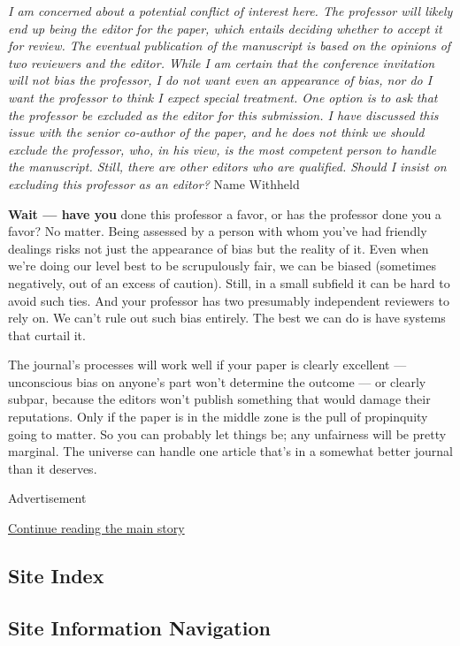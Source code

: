 \emph{I am concerned about a potential conflict of interest here. The
professor will likely end up being the editor for the paper, which
entails deciding whether to accept it for review. The eventual
publication of the manuscript is based on the opinions of two reviewers
and the editor. While I am certain that the conference invitation will
not bias the professor, I do not want even an appearance of bias, nor do
I want the professor to think I expect special treatment. One option is
to ask that the professor be excluded as the editor for this submission.
I have discussed this issue with the senior co-author of the paper, and
he does not think we should exclude the professor, who, in his view, is
the most competent person to handle the manuscript. Still, there are
other editors who are qualified. Should I insist on excluding this
professor as an editor?} Name Withheld

\textbf{Wait --- have you} done this professor a favor, or has the
professor done you a favor? No matter. Being assessed by a person with
whom you've had friendly dealings risks not just the appearance of bias
but the reality of it. Even when we're doing our level best to be
scrupulously fair, we can be biased (sometimes negatively, out of an
excess of caution). Still, in a small subfield it can be hard to avoid
such ties. And your professor has two presumably independent reviewers
to rely on. We can't rule out such bias entirely. The best we can do is
have systems that curtail it.

The journal's processes will work well if your paper is clearly
excellent --- unconscious bias on anyone's part won't determine the
outcome --- or clearly subpar, because the editors won't publish
something that would damage their reputations. Only if the paper is in
the middle zone is the pull of propinquity going to matter. So you can
probably let things be; any unfairness will be pretty marginal. The
universe can handle one article that's in a somewhat better journal than
it deserves.

Advertisement

\protect\hyperlink{after-bottom}{Continue reading the main story}

\hypertarget{site-index}{%
\subsection{Site Index}\label{site-index}}

\hypertarget{site-information-navigation}{%
\subsection{Site Information
Navigation}\label{site-information-navigation}}


